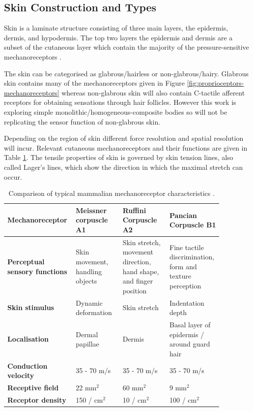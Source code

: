\subsection{Skin Construction and Types}
Skin is a laminate structure consisting of three main layers, the epidermis, dermis, and hypodermis. The top two layers the epidermis and dermis are a subset of the cutaneous layer which contain the majority of the pressure-sensitive mechanoreceptors \cite{McGrath2010}.

The skin can be categorised as glabrous/hairless or non-glabrous/hairy. Glabrous skin contains many of the mechanoreceptors given in Figure \ref{fig:proprioceptors-mechanoreceptors} whereas non-glabrous skin will also contain C-tactile afferent receptors for obtaining sensations through hair follicles. However this work is exploring simple monolithic/homogeneous-composite bodies so will not be replicating the sensor function of non-glabrous skin.

Depending on the region of skin different force resolution and spatial resolution will incur. Relevant cutaneous mechanoreceptors and their functions are given in Table \ref{tab:mechanoreceptors-table}. The tensile properties of skin is governed by skin tension lines, also called Lager's lines, which show the direction in which the maximal stretch can occur. 

\begin{table}[H]
    \centering
	\caption{Comparison of typical mammalian mechanoreceptor characteristics \cite{Roudaut2012}.}
	\label{tab:mechanoreceptors-table}
	\begin{tabular}{|p{0.24\linewidth}|p{0.21\linewidth}|p{0.21\linewidth}|p{0.21\linewidth}|} \hline
		\textbf{Mechanoreceptor} & Meissner corpuscle A1 & Ruffini Corpuscle A2 & Pancian Corpuscle B1 \\ \hline
		\textbf{Perceptual   sensory functions} & Skin movement, handling objects & Skin stretch, movement direction,   hand shape, and finger position & Fine tactile discrimination, form   and texture perception \\ \hline
		\textbf{Skin stimulus} & Dynamic deformation & Skin stretch & Indentation depth \\ \hline
		\textbf{Localisation} & Dermal papillae & Dermis & Basal layer of epidermis / around   guard hair \\ \hline
		\textbf{Conduction velocity} & 35 - 70 m/s & 35 - 70 m/s & 35 - 70 m/s  \\ \hline
		\textbf{Receptive field} & 22 mm$^2$ & 60 mm$^2$ & 9 mm$^2$ \\ \hline
		\textbf{Receptor density} & 150 / cm$^2$ & 10 / cm$^2$ & 100 / cm$^2$ \\ \hline
	\end{tabular}
\end{table}


